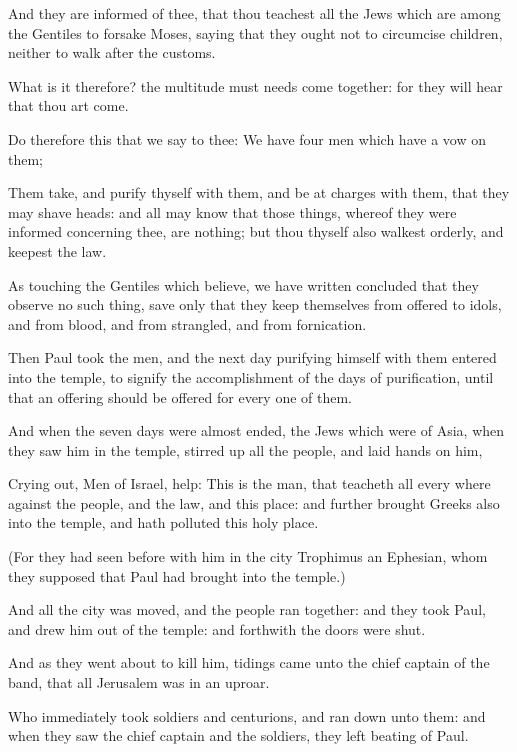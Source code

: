{And they are
informed
of
thee,
that thou
teachest
all the
Jews
which are
among the
Gentiles to
forsake
Moses, saying
that
they
ought
not to
circumcise
{}
children,
neither to walk
after the
customs.

What is
it
therefore? the
multitude
must
needs come
together:
for they will
hear
that thou art
come.

Do
therefore
this that we
say to
thee:
We
have
four
men
which
have a
vow
on
them;

Them
take, and purify
thyself
with
them,
and be at
charges
with
them,
that they may
shave
{}
heads:
and
all may
know
that those
things, whereof they were
informed
concerning
thee,
are
nothing;
but
{} thou
thyself
also walkest
orderly, and
keepest the
law.

As
touching the
Gentiles
which
believe,
we have
written
{} concluded
that
they
observe
no such
thing,
save only
that they
keep
themselves
from
{} offered to
idols,
and from
blood,
and from
strangled,
and from
fornication.

Then
Paul
took the
men, and the
next
day purifying
himself
with
them
entered
into the
temple, to
signify the
accomplishment of the
days of
purification,
until
that an offering should
be
offered
for
every
one of
them.


\par }{\PP {}And
when the
seven
days were
almost
ended, the
Jews which
were
of
Asia, when they
saw
him
in the
temple, stirred
up
all the
people,
and
laid
hands
on
him,

Crying
out,
Men of
Israel,
help:
This
is the
man, that
teacheth
all
{} every
where
against the
people,
and the
law,
and
this
place:
and
further
brought
Greeks
also
into the
temple,
and hath
polluted
this
holy
place.

(For they
had seen
before
with
him
in the
city
Trophimus an
Ephesian,
whom they
supposed
that
Paul had
brought
into the
temple.)

And
all the
city
was
moved,
and the
people ran
together:
and they
took
Paul, and
drew
him out
of the
temple:
and
forthwith the
doors were
shut.

And as they went
about to
kill
him,
tidings came
unto the chief
captain of the
band,
that
all
Jerusalem was in an
uproar.

Who
immediately
took
soldiers
and
centurions, and ran
down
unto
them:
and when they
saw the chief
captain
and the
soldiers, they
left
beating of
Paul.

}

